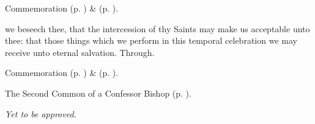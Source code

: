\begin{rubric}
    Commemoration  (p. \pageref{EphesianCollect}) \&  (p. \pageref{SPMaryPostChristmas}).
\end{rubric}


\postcommunion\label{MariusEtcPostcommunion}
 we beseech thee, that the intercession of thy Saints may make us acceptable unto thee: that those things which we perform in this temporal celebration we may receive unto eternal salvation. Through.

\begin{rubric}
    Commemoration  (p. \pageref{EphesianCollect}) \&  (p. \pageref{SPMaryPostChristmas}).
\end{rubric}


\clearpage

\begin{rubric}
	The Second Common of a Confessor Bishop (p. \pageref{CommonConfessorBishopII}).
\end{rubric}

\par\noindent
\textit{Yet to be approved.}

\vspace{-1ex}

